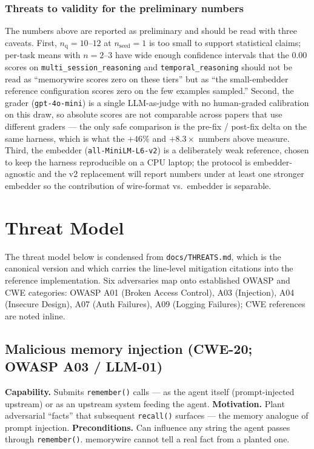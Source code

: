 \documentclass[11pt,letterpaper,twocolumn]{article}
\begin{document}
\subsubsection*{Threats to validity for the preliminary numbers}

The numbers above are reported as preliminary and should be read with three caveats. First, $n_{\text{q}} = 10$--$12$ at $n_{\text{seed}} = 1$ is too small to support statistical claims; per-task means with $n = 2$--$3$ have wide enough confidence intervals that the 0.00 scores on \texttt{multi\_session\_reasoning} and \texttt{temporal\_reasoning} should not be read as ``memorywire scores zero on these tiers'' but as ``the small-embedder reference configuration scores zero on the few examples sampled.'' Second, the grader (\texttt{gpt-4o-mini}) is a single LLM-as-judge with no human-graded calibration on this draw, so absolute scores are not comparable across papers that use different graders --- the only safe comparison is the pre-fix / post-fix delta on the same harness, which is what the $+46\%$ and $+8.3\times$ numbers above measure. Third, the embedder (\texttt{all-MiniLM-L6-v2}) is a deliberately weak reference, chosen to keep the harness reproducible on a CPU laptop; the protocol is embedder-agnostic and the v2 replacement will report numbers under at least one stronger embedder so the contribution of wire-format vs.\ embedder is separable.

\section{Threat Model}
\label{sec:threats}

The threat model below is condensed from \texttt{docs/THREATS.md}, which is the canonical version and which carries the line-level mitigation citations into the reference implementation. Six adversaries map onto established OWASP and CWE categories: OWASP A01 (Broken Access Control), A03 (Injection), A04 (Insecure Design), A07 (Auth Failures), A09 (Logging Failures); CWE references are noted inline.

\subsection{Malicious memory injection (CWE-20; OWASP A03 / LLM-01)}
\label{sec:threats-injection}

\textbf{Capability.} Submits \texttt{remember()} calls --- as the agent itself (prompt-injected upstream) or as an upstream system feeding the agent. \textbf{Motivation.} Plant adversarial ``facts'' that subsequent \texttt{recall()} surfaces --- the memory analogue of prompt injection. \textbf{Preconditions.} Can influence any string the agent passes through \texttt{remember()}. memorywire cannot tell a real fact from a planted one.
\end{document}
